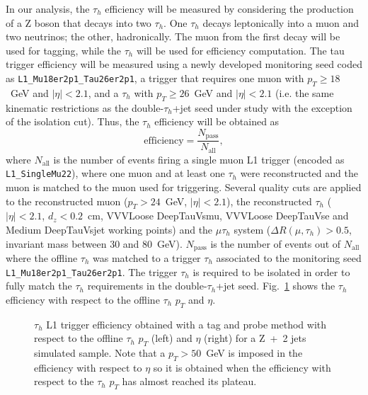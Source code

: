\documentclass[../main.tex]{subfiles}
\begin{document}
In our analysis, the $\tau_h$ efficiency will be measured by considering the production of a Z boson that decays into two $\tau_h$. One $\tau_h$ decays leptonically into a muon and two neutrinos; the other, hadronically. The muon from the first decay will be used for tagging, while the $\tau_h$ will be used for efficiency computation. The tau trigger efficiency will be measured using a newly developed monitoring seed coded as \texttt{L1\_Mu18er2p1\_Tau26er2p1}, a trigger that requires one muon with $p_T\geq18$~GeV and $|\eta|<2.1$, and a $\tau_h$ with $p_T\geq26$~GeV and $|\eta|<2.1$ (i.e. the same kinematic restrictions as the double-$\tau_h$+jet seed under study with the exception of the isolation cut). Thus, the $\tau_h$ efficiency will be obtained as
\begin{equation}
\text{efficiency} = \frac{N_\text{pass}}{N_\text{all}},
\end{equation}
where $N_\text{all}$ is the number of events firing a single muon L1 trigger (encoded as \texttt{L1\_SingleMu22}), where one muon and at least one $\tau_h$ were reconstructed and the muon is matched to the muon used for triggering. Several quality cuts are applied to the reconstructed muon ($p_T>24$~GeV, $|\eta|<2.1$), the reconstructed $\tau_h$ ($|\eta|<2.1$, $d_z<0.2$~cm, VVVLoose DeepTauVsmu, VVVLoose DeepTauVse and Medium DeepTauVsjet working points) and the $\mu\tau_h$ system ($\Delta R(\mu, \tau_h) > 0.5$, invariant mass between 30 and 80~GeV). $N_\text{pass}$ is the number of events out of $N_\text{all}$ where the offline $\tau_h$ was matched to a trigger $\tau_h$ associated to the monitoring seed \texttt{L1\_Mu18er2p1\_Tau26er2p1}. The trigger $\tau_h$ is required to be isolated in order to fully match the $\tau_h$ requirements in the double-$\tau_h$+jet seed. Fig.~\ref{hh:fig:l1_eff_tauleg} shows the $\tau_h$ efficiency with respect to the offline $\tau_h$ $p_T$ and $\eta$.

\begin{figure}[h!]
\begin{center}
\end{center}
\caption{$\tau_h$ L1 trigger efficiency obtained with a tag and probe method with respect to the offline $\tau_h$ $p_T$ (left) and $\eta$ (right) for a Z~+~2 jets simulated sample. Note that a $p_T>50$~GeV is imposed in the efficiency with respect to $\eta$ so it is obtained when the efficiency with respect to the $\tau_h$ $p_T$ has almost reached its plateau. }
\label{hh:fig:l1_eff_tauleg}
\end{figure}
\end{document}
